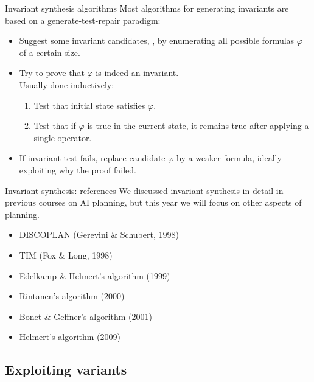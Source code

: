 \documentclass{gkibeamer}
\begin{document}
\begin{frame}{Invariant synthesis algorithms}
  Most algorithms for generating invariants are based on a
  \alert{generate-test-repair} paradigm:
  \begin{itemize}
  \item {} Suggest some invariant candidates, \eg,
    by enumerating all possible formulas $\varphi$ of a certain
    size.
  \item {} Try to prove that $\varphi$ is indeed an
    invariant. \\
    Usually done \alert{inductively}:
    \begin{enumerate}
    \item Test that \alert{initial state} satisfies $\varphi$.
    \item Test that if $\varphi$ is true in the current state,
      it remains true after applying a single operator.
    \end{enumerate}
  \item {} If invariant test fails, replace candidate
    $\varphi$ by a \alert{weaker} formula, ideally exploiting
    \alert{why} the proof failed.
  \end{itemize}
\end{frame}

\begin{frame}{Invariant synthesis: references}
  We discussed invariant synthesis in detail in previous courses on AI
  planning, but this year we will focus on other aspects of planning.%

  \bigskip

  \begin{itemize}
  \item DISCOPLAN (Gerevini \& Schubert, 1998)
  \item TIM (Fox \& Long, 1998)
  \item Edelkamp \& Helmert's algorithm (1999)
  \item Rintanen's algorithm (2000)
  \item Bonet \& Geffner's algorithm (2001)
  \item Helmert's algorithm (2009)
  \end{itemize}
\end{frame}

\subsection{Exploiting variants}
\end{document}

